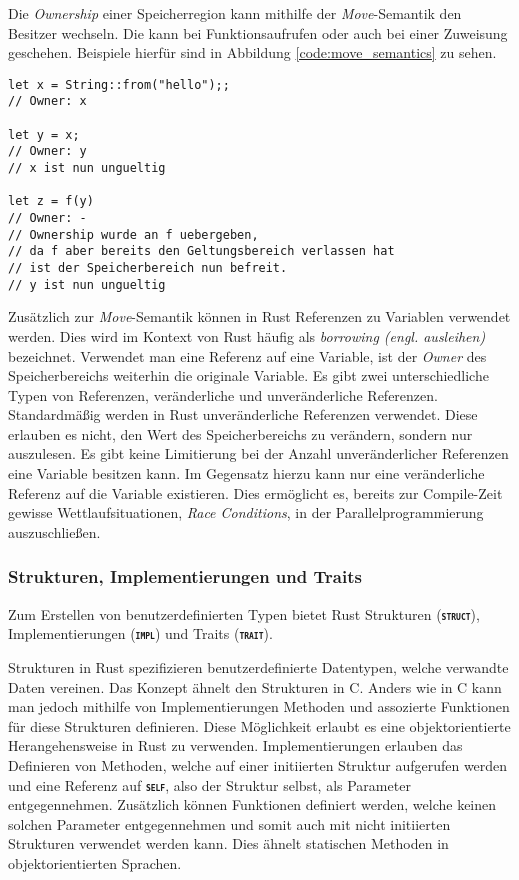 Die \textit{Ownership} einer Speicherregion kann mithilfe der \textit{Move}-Semantik den Besitzer wechseln.
Die kann bei Funktionsaufrufen oder auch bei einer Zuweisung geschehen. Beispiele hierfür sind in Abbildung
\ref{code:move_semantics} zu sehen.\cite{rustBook}

\begin{lstlisting}[float,caption={Beispieldarstellung der \textit{Move}-Semantik},label=code:move_semantics]
let x = String::from("hello");;
// Owner: x

let y = x;
// Owner: y
// x ist nun ungueltig

let z = f(y) 
// Owner: -
// Ownership wurde an f uebergeben,
// da f aber bereits den Geltungsbereich verlassen hat
// ist der Speicherbereich nun befreit.
// y ist nun ungueltig
\end{lstlisting}\cite{rustBook}

Zusätzlich zur \textit{Move}-Semantik können in Rust Referenzen zu Variablen verwendet werden. Dies wird im Kontext
von Rust häufig als \textit{borrowing (engl. ausleihen)} bezeichnet. Verwendet man eine Referenz auf eine Variable,
ist der \textit{Owner} des Speicherbereichs weiterhin die originale Variable. Es gibt zwei unterschiedliche
Typen von Referenzen, veränderliche und unveränderliche Referenzen. Standardmäßig werden in Rust unveränderliche
Referenzen verwendet. Diese erlauben es nicht, den Wert des Speicherbereichs zu verändern, sondern nur auszulesen.
Es gibt keine Limitierung bei der Anzahl unveränderlicher Referenzen eine Variable besitzen kann. Im Gegensatz
hierzu kann nur eine veränderliche Referenz auf die Variable existieren. Dies ermöglicht es, bereits zur
Compile-Zeit gewisse Wettlaufsituationen, \textit{Race Conditions}, in der Parallelprogrammierung auszuschließen. 
\cite{rustBook}

\subsubsection{Strukturen, Implementierungen und Traits}

Zum Erstellen von benutzerdefinierten Typen bietet Rust Strukturen (\texttt{\textsc{\textbf{struct}}}),
Implementierungen (\texttt{\textsc{\textbf{impl}}}) und Traits (\texttt{\textsc{\textbf{trait}}}).

Strukturen in Rust spezifizieren benutzerdefinierte Datentypen, welche verwandte Daten vereinen. Das Konzept
ähnelt den Strukturen in C. Anders wie in C kann man jedoch mithilfe von Implementierungen Methoden und assozierte
Funktionen für diese Strukturen definieren.
Diese Möglichkeit erlaubt es eine objektorientierte Herangehensweise in Rust zu verwenden.
Implementierungen erlauben das Definieren von Methoden, welche auf einer initiierten Struktur aufgerufen werden
und eine Referenz auf \texttt{\textsc{\textbf{self}}}, also der Struktur selbst, als Parameter entgegennehmen.
Zusätzlich können Funktionen definiert werden, welche keinen solchen Parameter entgegennehmen und somit auch mit
nicht initiierten Strukturen verwendet werden kann. Dies ähnelt statischen Methoden in objektorientierten
Sprachen.\cite{rustBook}

